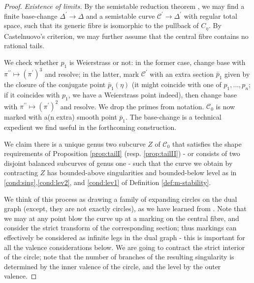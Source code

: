 \documentclass[11pt]{amsart}
\renewcommand{\to}{\rightarrow}
\newcommand{\dvr}{\Delta}
\theoremstyle{plain}
\theoremstyle{definition}
\begin{document}
\begin{proof}
 \emph{Existence of limits.}
  By the semistable reduction theorem \cite[Corollary 2.7]{DM}, we may find a finite base-change $\dvr^\prime\to\dvr$ and a semistable curve $\mathcal C^\prime\to\dvr^\prime$ with regular total space, such that its generic fibre is isomorphic to the pullback of $C_\eta$. By Castelnuovo's criterion, we may further assume that the central fibre contains no rational tails.
  
  We check whether $p_1$ is Weierstrass or not: in the former case, change base with $\pi^{\prime\prime}\mapsto(\pi^\prime)^3$ and resolve; in the latter, mark $\mathcal C^\prime$ with an extra section $\bar p_1$ given by the closure of the conjugate point $\bar p_1(\eta)$ (it might coincide with one of $p_1,\ldots,p_n$; if it coincides with $p_1$, we have a Weierstrass point indeed), then change base with $\pi^{\prime\prime}\mapsto(\pi^\prime)^2$ and resolve. We drop the primes from notation. $\mathcal C_0$ is now marked with a(n extra) smooth point $\bar p_1$. The base-change is a technical expedient we find useful in the forthcoming construction.
  
  We claim there is a unique genus two subcurve $Z$ of $\mathcal C_0$ that satisfies the shape requirements of Proposition \ref{prop:tailI} (resp. \ref{prop:tailII}) - or consists of two disjoint balanced subcurves of genus one - such that the curve we obtain by contracting $Z$ has bounded-above singularities and bounded-below level as in \eqref{cond:sing},\eqref{cond:lev2}, and \eqref{cond:lev1} of Definition \ref{def:m-stability}.
  
  We think of this process as drawing a family of expanding circles on the dual graph (except, they are not exactly circles), as we have learned from \cite{RSPW1}. Note that we may at any point blow the curve up at a marking on the central fibre, and consider the strict transform of the corresponding section; thus markings can effectively be considered as infinite legs in the dual graph - this is important for all the valence considerations below. We are going to contract the strict interior of the circle; note that the number of branches of the resulting singularity is determined by the inner valence of the circle, and the level by the outer valence.
  

\end{proof}
\end{document}
